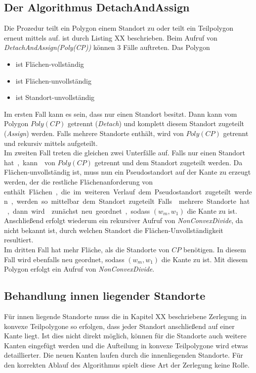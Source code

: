 \documentclass[ngerman]{seminarbeitrag}
\begin{document}

\subsection{Der Algorithmus DetachAndAssign}\label{detach}
Die Prozedur \daa teilt ein Polygon einem Standort zu oder teilt ein Teilpolygon erneut mittels \noncon auf. \daa ist durch Listing XX beschrieben.
Beim Aufruf von \emph{DetachAndAssign(Poly(CP))} können 3 Fälle auftreten. Das Polygon
\begin{itemize}
\item {} ist Flächen-vollständig
\item {} ist Flächen-unvollständig
\item {} ist Standort-unvollständig
\end{itemize}
Im ersten Fall kann es sein, dass  nur einen Standort besitzt. Dann kann  vom Polygon $Poly(CP)$ getrennt (\emph{Detach}) und komplett diesem Standort zugeteilt (\emph{Assign}) werden.
Falls  mehrere Standorte enthält, wird  von $Poly(CP)$ getrennt und rekursiv mittels \noncon aufgeteilt. \\
Im zweiten Fall treten die gleichen zwei Unterfälle auf. Falls  nur einen Standort \si hat, kann  von $Poly(CP)$ getrennt und dem Standort zugeteilt werden. Da  Flächen-unvollständig ist, muss nun ein Pseudostandort auf der Kante zu  erzeugt werden, der die restliche Flächenanforderung von \si enthält. Flächen, die im weiteren Verlauf dem Pseudostandort zugeteilt werden, werden so mittelbar dem Standort \si zugeteilt.
Falls  mehrere Standorte hat, dann wird  zunächst neu geordnet, sodass $(w_{m}, w_{1})$ die Kante zu  ist. Anschließend erfolgt wiederum ein rekursiver Aufruf von \mbox{\textit{NonConvexDivide}}, da nicht bekannt ist, durch welchen Standort die Flächen-Unvollständigkeit resultiert.\\
Im dritten Fall hat  mehr Fläche, als die Standorte von $CP$ benötigen. In diesem Fall wird  ebenfalls neu geordnet, sodass $(w_{m}, w_{1})$ die Kante zu  ist. Mit diesem Polygon erfolgt ein Aufruf von \mbox{\textit{NonConvexDivide}}.

\subsection{Behandlung innen liegender Standorte}\label{innere Standorte}
Für innen liegende Standorte muss die in Kapitel XX beschriebene Zerlegung in konvexe Teilpolygone so erfolgen, dass jeder Standort anschließend auf einer Kante liegt. Ist dies nicht direkt möglich, können für die Standorte auch weitere Kanten eingefügt werden und die Aufteilung in konvexe Teilpolygone wird etwas detaillierter. Die neuen Kanten laufen durch die innenliegenden Standorte. Für den korrekten Ablauf des Algorithmus spielt diese Art der Zerlegung keine Rolle.
\end{document}
